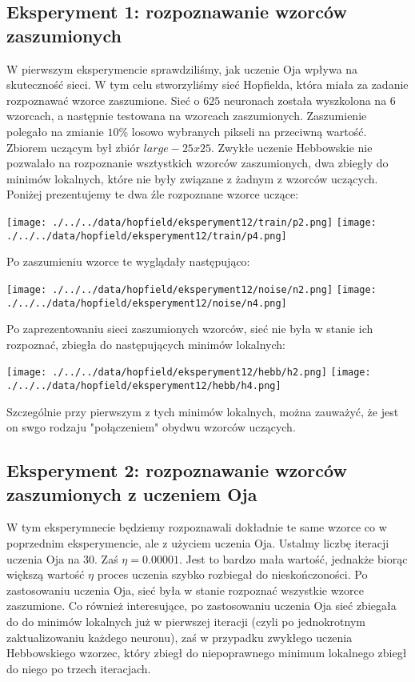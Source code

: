 \documentclass{article}
\begin{document}
\subsection{Eksperyment 1: rozpoznawanie wzorców zaszumionych}\label{eksperyment1}
W pierwszym eksperymencie sprawdziliśmy, jak uczenie Oja wpływa na skuteczność sieci.
W tym celu stworzyliśmy sieć Hopfielda, która miała za zadanie rozpoznawać wzorce zaszumione.
Sieć o $625$ neuronach została wyszkolona na $6$ wzorcach, a następnie testowana na wzorcach zaszumionych.
Zaszumienie polegało na zmianie $10\%$ losowo wybranych pikseli na przeciwną wartość.
Zbiorem uczącym był zbiór $large-25x25$. Zwykłe uczenie Hebbowskie nie pozwalało na rozpoznanie wsztystkich wzorców zaszumionych,
dwa zbiegły do minimów lokalnych, które nie były związane z żadnym z wzorców uczących.
Poniżej prezentujemy te dwa źle rozpoznane wzorce uczące:
\begin{center}
    \texttt{[image: ./../../data/hopfield/eksperyment12/train/p2.png]}
    \texttt{[image: ./../../data/hopfield/eksperyment12/train/p4.png]}
\end{center}
Po zaszumieniu wzorce te wyglądały następująco:
\begin{center}
    \texttt{[image: ./../../data/hopfield/eksperyment12/noise/n2.png]}
    \texttt{[image: ./../../data/hopfield/eksperyment12/noise/n4.png]}
\end{center}
Po zaprezentowaniu sieci zaszumionych wzorców, sieć nie była w stanie ich rozpoznać, zbiegła
do następujących minimów lokalnych:
\begin{center}
    \texttt{[image: ./../../data/hopfield/eksperyment12/hebb/h2.png]}
    \texttt{[image: ./../../data/hopfield/eksperyment12/hebb/h4.png]}
\end{center}
Szczególnie przy pierwszym z tych minimów lokalnych, można zauważyć, że jest on swgo rodzaju "połączeniem" 
obydwu wzorców uczących.
\subsection{Eksperyment 2: rozpoznawanie wzorców zaszumionych z uczeniem Oja}
W tym eksperymnecie będziemy rozpoznawali dokładnie te same wzorce co w poprzednim eksperymencie, 
ale z użyciem uczenia Oja. Ustalmy liczbę iteracji uczenia Oja na $30$. Zaś $\eta = 0.00001$.
Jest to bardzo mała wartość, jednakże biorąc większą wartość $\eta$ proces uczenia szybko rozbiegał do nieskończoności.
Po zastosowaniu uczenia Oja, sieć była w stanie rozpoznać wszystkie wzorce zaszumione.
Co również interesujące, po zastosowaniu uczenia Oja sieć zbiegała do do minimów lokalnych już w pierwszej iteracji
(czyli po jednokrotnym zaktualizowaniu każdego neuronu), zaś w przypadku zwykłego uczenia Hebbowskiego wzorzec, który
zbiegł do niepoprawnego minimum lokalnego zbiegł do niego po trzech iteracjach.
\end{document}
